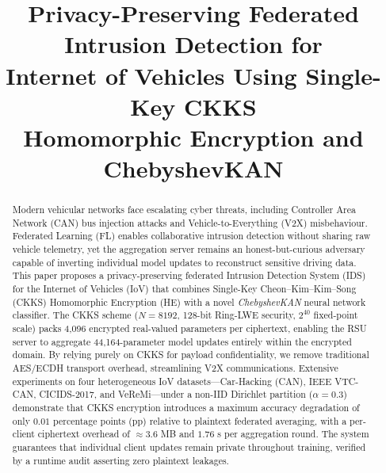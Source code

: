 \documentclass[conference]{IEEEtran}
\begin{document}
\title{Privacy-Preserving Federated Intrusion Detection for\\
Internet of Vehicles Using Single-Key CKKS\\
Homomorphic Encryption and ChebyshevKAN}

\author{
  \and
}

\maketitle

\begin{abstract}
Modern vehicular networks face escalating cyber threats, including
Controller Area Network (CAN) bus injection attacks and Vehicle-to-Everything
(V2X) misbehaviour. Federated Learning (FL) enables collaborative intrusion
detection without sharing raw vehicle telemetry, yet the aggregation server
remains an honest-but-curious adversary capable of inverting individual
model updates to reconstruct sensitive driving data. This paper proposes a
privacy-preserving federated Intrusion Detection System (IDS) for the Internet
of Vehicles (IoV) that combines Single-Key Cheon--Kim--Kim--Song (CKKS)
Homomorphic Encryption (HE) with a novel \emph{ChebyshevKAN} neural network
classifier. The CKKS scheme ($N{=}8192$, 128-bit Ring-LWE security, $2^{40}$
fixed-point scale) packs 4,096 encrypted real-valued parameters per ciphertext,
enabling the RSU server to aggregate 44,164-parameter model updates entirely
within the encrypted domain. By relying purely on CKKS for payload confidentiality,
we remove traditional AES/ECDH transport overhead, streamlining V2X communications.
Extensive experiments on four heterogeneous IoV datasets---Car-Hacking (CAN),
IEEE VTC-CAN, CICIDS-2017, and VeReMi---under a non-IID Dirichlet partition
($\alpha{=}0.3$) demonstrate that CKKS encryption introduces a maximum accuracy
degradation of only $0.01$ percentage points (pp) relative to plaintext federated
averaging, with a per-client ciphertext overhead of ${\approx}3.6$ MB and $1.76$ s
per aggregation round. The system guarantees that individual client updates remain
private throughout training, verified by a runtime audit asserting zero plaintext
leakages.
\end{abstract}
\end{document}
